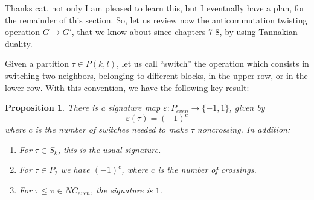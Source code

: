 \documentclass[12pt]{amsbook}
\newtheorem{proposition}[theorem]{Proposition}
\begin{document}
Thanks cat, not only I am pleased to learn this, but I eventually have a plan, for the remainder of this section. So, let us review now the anticommutation twisting operation $G\to G'$, that we know about since chapters 7-8, by using Tannakian duality.

\bigskip

Given a partition $\tau\in P(k,l)$, let us call ``switch'' the operation which consists in switching two neighbors, belonging to different blocks, in the upper row, or in the lower row. With this convention, we have the following key result:


\begin{proposition}
There is a signature map $\varepsilon:P_{even}\to\{-1,1\}$, given by 
$$\varepsilon(\tau)=(-1)^c$$
where $c$ is the number of switches needed to make $\tau$ noncrossing. In addition:
\begin{enumerate}
\item For $\tau\in S_k$, this is the usual signature.

\item For $\tau\in P_2$ we have $(-1)^c$, where $c$ is the number of crossings.

\item For $\tau\leq\pi\in NC_{even}$, the signature is $1$.
\end{enumerate}
\end{proposition}
\end{document}
